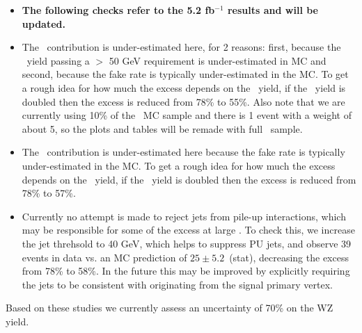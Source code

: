 \begin{itemize}

\item {\bf The following checks refer to the 5.2 fb$^{-1}$ results and will be updated.}

\item The \zjets\ contribution is under-estimated here, for 2 reasons: first, because the \zjets\
yield passing a \MET $>$ 50 GeV requirement is under-estimated in MC and second, because the fake
rate is typically under-estimated in the MC. To get a rough idea for how much the excess depends
on the \zjets\ yield, if the \zjets\ yield is doubled then the excess is reduced from 78\% to 55\%.
Also note that we are currently using 10\% of the \zjets\ MC sample and there is 1 event with a weight 
of about 5, so the plots and tables will be remade with full \zjets\ sample.

\item The \ttbar\ contribution is under-estimated here because the fake
rate is typically under-estimated in the MC. To get a rough idea for how much the excess depends
on the \ttbar\ yield, if the \ttbar\ yield is doubled then the excess is reduced from 78\% to 57\%.

\item Currently no attempt is made to reject jets from pile-up interactions, which may be responsible
for some of the excess at large \njets. To check this, we increase the jet \pt threhsold to 40 GeV, which
helps to suppress PU jets, and observe 39 events in data vs. an MC prediction of $25\pm5.2$~(stat),
decreasing the excess from 78\% to 58\%. In the future this may be improved by explicitly
requiring the jets to be consistent with originating from the signal primary vertex.

\end{itemize}

Based on these studies we currently assess an uncertainty of 70\% on the WZ yield.

